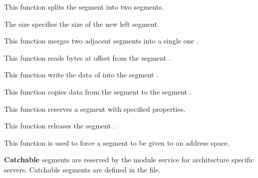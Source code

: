 	 {
	   This function splits the segment  into two segments.

	   The size  specifies the size of the new left segment.
	 }

	 {
	   This function merges two adjacent segments into a single
	   one .
	 }

	 {
	   This function reads  bytes at offset
	    from the segment .
	 }

	 {
	   This function write the data of  into the
	   segment .
	 }

	 {
	   This function copies data from the segment  to
	   the segment .
	 }

	 {
	   This function reserves a segment with specified properties.
	 }

	 {
	   This function releases the segment .
	 }

	 {
	   This function is used to force a segment to be given to an address
	   space.

	   \textbf{Catchable} segments are reserved by the module service
	   for architecture specific servers. Catchable segments
	   are defined in the  file.
	 }

